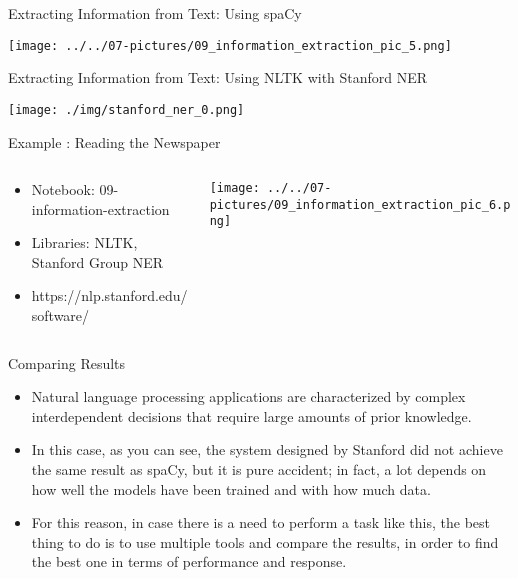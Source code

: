 \documentclass[11pt]{beamer}
\begin{document}
\begin{frame}{Extracting Information from Text: Using spaCy}
	\begin{center}
	\texttt{[image: ../../07-pictures/09\_information\_extraction\_pic\_5.png]}
	\end{center}
\end{frame}
\begin{frame}{\small Extracting Information from Text: Using NLTK with Stanford NER}
	\begin{center}
	\texttt{[image: ./img/stanford\_ner\_0.png]}
	\end{center}
\end{frame}
\begin{frame}{Example : Reading the Newspaper }
\begin{columns}[T] %
\begin{column}{.48\textwidth}
        \begin{itemize}
		\item Notebook: 09-information-extraction
		\item Libraries: NLTK, Stanford Group NER
		\item https://nlp.stanford.edu/software/
        \end{itemize}
\end{column}%
\hfill%
\begin{column}{.48\textwidth}
        \texttt{[image: ../../07-pictures/09\_information\_extraction\_pic\_6.png]}
\end{column}%
\end{columns}
\end{frame}
\begin{frame}{Comparing Results}

\begin{itemize}
\item Natural language processing applications are characterized by complex interdependent decisions that require large amounts of prior knowledge. 
\item In this case, as you can see, the system designed by Stanford did not achieve the same result as spaCy, but it is pure accident; in fact, a lot depends on how well the models have been trained and with how much data. 
\item For this reason, in case there is a need to perform a task like this, the best thing to do is to use multiple tools and compare the results, in order to find the best one in terms of performance and response.
\end{itemize}
\end{frame}
\end{document}
